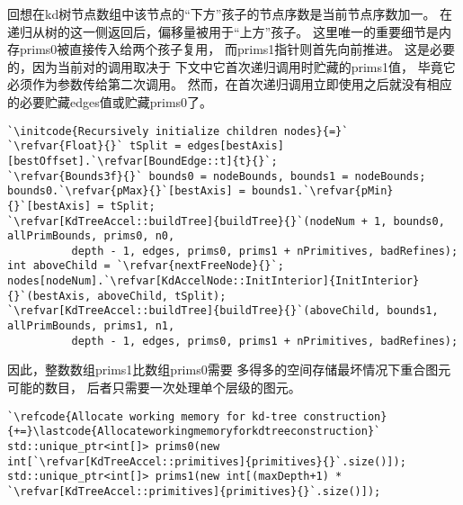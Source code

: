 回想在kd树节点数组中该节点的“下方”孩子的节点序数是当前节点序数加一。
在递归从树的这一侧返回后，偏移量被用于“上方”孩子。
这里唯一的重要细节是内存{\ttfamily prims0}被直接传入给两个孩子复用，
而{\ttfamily prims1}指针则首先向前推进。
这是必要的，因为当前对的调用取决于
下文中它首次递归调用时贮藏的{\ttfamily prims1}值，
毕竟它必须作为参数传给第二次调用。
然而，在首次递归调用立即使用之后就没有相应的必要贮藏{\ttfamily edges}值或贮藏{\ttfamily prims0}了。
\begin{lstlisting}
`\initcode{Recursively initialize children nodes}{=}`
`\refvar{Float}{}` tSplit = edges[bestAxis][bestOffset].`\refvar[BoundEdge::t]{t}{}`;
`\refvar{Bounds3f}{}` bounds0 = nodeBounds, bounds1 = nodeBounds;
bounds0.`\refvar{pMax}{}`[bestAxis] = bounds1.`\refvar{pMin}{}`[bestAxis] = tSplit;
`\refvar[KdTreeAccel::buildTree]{buildTree}{}`(nodeNum + 1, bounds0, allPrimBounds, prims0, n0,
          depth - 1, edges, prims0, prims1 + nPrimitives, badRefines);
int aboveChild = `\refvar{nextFreeNode}{}`;
nodes[nodeNum].`\refvar[KdAccelNode::InitInterior]{InitInterior}{}`(bestAxis, aboveChild, tSplit);
`\refvar[KdTreeAccel::buildTree]{buildTree}{}`(aboveChild, bounds1, allPrimBounds, prims1, n1, 
          depth - 1, edges, prims0, prims1 + nPrimitives, badRefines);
\end{lstlisting}

因此，整数数组{\ttfamily prims1}比数组{\ttfamily prims0}需要
多得多的空间存储最坏情况下重合图元可能的数目，
后者只需要一次处理单个层级的图元。
\begin{lstlisting}
`\refcode{Allocate working memory for kd-tree construction}{+=}\lastcode{Allocateworkingmemoryforkdtreeconstruction}`
std::unique_ptr<int[]> prims0(new int[`\refvar[KdTreeAccel::primitives]{primitives}{}`.size()]);
std::unique_ptr<int[]> prims1(new int[(maxDepth+1) * `\refvar[KdTreeAccel::primitives]{primitives}{}`.size()]);
\end{lstlisting}

